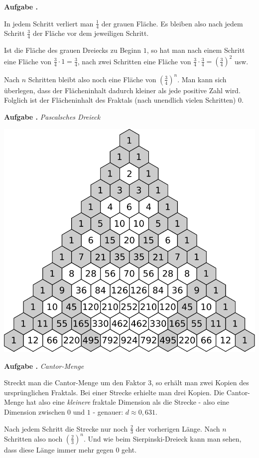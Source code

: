 \documentclass[a4paper,ngerman,12pt]{scrartcl}
\theoremstyle{definition}
\theoremstyle{plain}
\theoremstyle{remark}
\newlength{\aufgabenskip}
\newcounter{aufgabennummer}
\newenvironment{aufgabe}[1]{
  \addtocounter{aufgabennummer}{1}
  \textbf{Aufgabe \theaufgabennummer.} \emph{#1} \par
}{\vspace{\aufgabenskip}}
\begin{document}
\begin{aufgabe}{}
	In jedem Schritt verliert man $\frac{1}{4}$ der grauen Fläche. Es bleiben also nach jedem Schritt $\frac{3}{4}$ der Fläche vor dem jeweiligen Schritt.
	
	Ist die Fläche des grauen Dreiecks zu Beginn $1$, so hat man nach einem Schritt eine Fläche von $\frac{3}{4}\cdot 1 = \frac{3}{4}$, nach zwei Schritten eine Fläche von $\frac{3}{4} \cdot \frac{3}{4} = \left(\frac{3}{4}\right)^2$ usw.
	
	Nach $n$ Schritten bleibt also noch eine Fläche von $\left(\frac{3}{4}\right)^n$. Man kann sich überlegen, dass der Flächeninhalt dadurch kleiner als jede positive Zahl wird. Folglich ist der Flächeninhalt des Fraktals (\glqq nach unendlich vielen Schritten\grqq) $0$.
\end{aufgabe}

\begin{aufgabe}{Pascalsches Dreieck}
	\begin{center}
		\includegraphics[width=.6\textwidth]{Bilder/Pascalsches-Dreieck-gefuellt-grau.pdf}
	\end{center}
\end{aufgabe}

\begin{aufgabe}{Cantor-Menge}
	Streckt man die Cantor-Menge um den Faktor $3$, so erhält man zwei Kopien des ursprünglichen Fraktals. Bei einer Strecke erhielte man drei Kopien. Die Cantor-Menge hat also eine \emph{kleinere} fraktale Dimension als die Strecke - also eine Dimension zwischen $0$ und $1$ - genauer: $d \approx 0,631$.
	
	Nach jedem Schritt die Strecke nur noch $\frac{2}{3}$ der vorherigen Länge. Nach $n$ Schritten also noch $\left(\frac{2}{3}\right)^n$. Und wie beim Sierpinski-Dreieck kann man sehen, dass diese Länge immer mehr gegen $0$ geht.
\end{aufgabe}
\end{document}

